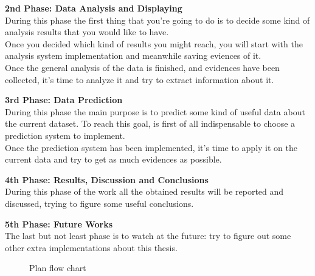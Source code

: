 \textbf{2nd Phase: Data Analysis and Displaying}\\
During this phase the first thing that you’re going to do is to decide some kind of analysis results that you would like to have.\\
Once you decided which kind of results you might reach, you will start with the analysis system implementation and meanwhile saving eviences of it.\\
Once the general analysis of the data is finished, and evidences have been collected, it's time to analyze it and try to extract information about it.

\newpage

\textbf{3rd Phase: Data Prediction}\\
During this phase the main purpose is to predict some kind of useful data about the current dataset. To reach this goal, is first of all indispensable to choose a prediction system to implement. \\
Once the prediction system has been implemented, it's time to apply it on the current data and try to get as much evidences as possible.

\textbf{4th Phase: Results, Discussion and Conclusions }\\
During this phase of the work all the obtained results will be reported and discussed, trying to figure some useful conclusions.

\textbf{5th Phase: Future Works}\\
The last but not least phase is to watch at the future: try to figure out some other extra implementations about this thesis.\\

\begin{figure}[h]

    \caption[Plan flow chart]{Plan flow chart}
    \label{fig: Development_Flow}
\end{figure}


